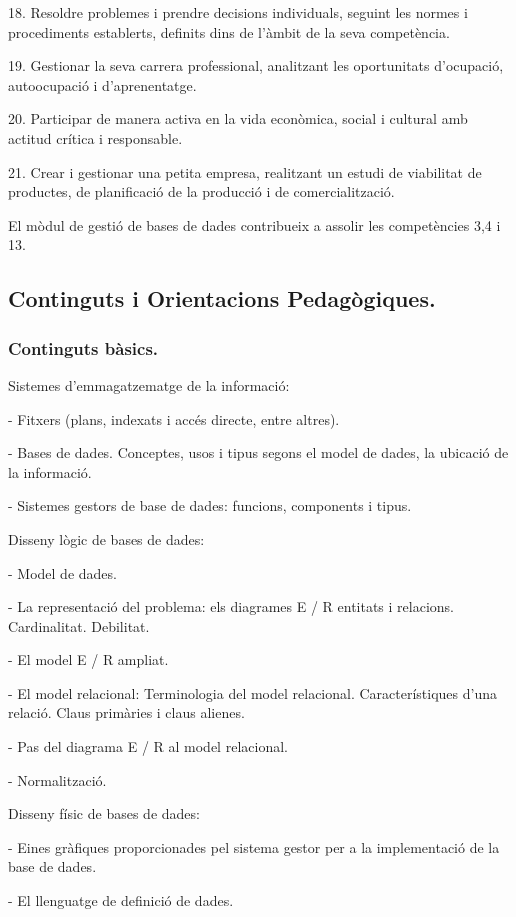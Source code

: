 \documentclass[catalan, a4paper, 12pt, titlepage]{article}
\begin{document}
18. Resoldre problemes i prendre decisions individuals, seguint les normes i procediments establerts, definits dins de l'àmbit de la seva competència.

19. Gestionar la seva carrera professional, analitzant les oportunitats d'ocupació, autoocupació i d'aprenentatge.

20. Participar de manera activa en la vida econòmica, social i cultural amb actitud crítica i responsable.

21. Crear i gestionar una petita empresa, realitzant un estudi de viabilitat de productes, de planificació de la producció i de comercialització.

El mòdul de gestió de bases de dades contribueix a assolir les competències 3,4 i 13.

\subsection{Continguts i Orientacions Pedagògiques.}

\subsubsection{Continguts bàsics.}

Sistemes d'emmagatzematge de la informació:

- Fitxers (plans, indexats i accés directe, entre altres).

- Bases de dades. Conceptes, usos i tipus segons el model de dades, la ubicació de la informació.

- Sistemes gestors de base de dades: funcions, components i tipus.

Disseny lògic de bases de dades:

- Model de dades.

- La representació del problema: els diagrames E / R entitats i relacions. Cardinalitat. Debilitat.

- El model E / R ampliat.

- El model relacional: Terminologia del model relacional. Característiques d'una relació. Claus primàries i claus alienes.

- Pas del diagrama E / R al model relacional.

- Normalització.

Disseny físic de bases de dades:

- Eines gràfiques proporcionades pel sistema gestor per a la implementació de la base de dades.

- El llenguatge de definició de dades.
\end{document}
